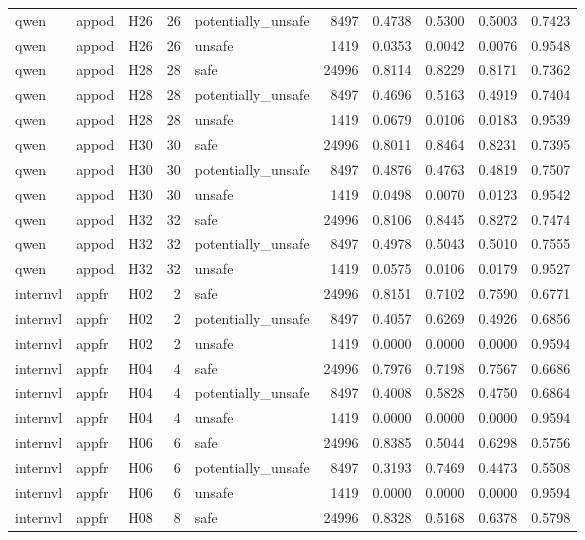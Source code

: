 \begin{table}[tbp]
\begin{tabular}{lllrlrrrrr}
qwen & appod & H26 & 26 & potentially\_unsafe & 8497 & 0.4738 & 0.5300 & 0.5003 & 0.7423 \\
qwen & appod & H26 & 26 & unsafe & 1419 & 0.0353 & 0.0042 & 0.0076 & 0.9548 \\
qwen & appod & H28 & 28 & safe & 24996 & 0.8114 & 0.8229 & 0.8171 & 0.7362 \\
qwen & appod & H28 & 28 & potentially\_unsafe & 8497 & 0.4696 & 0.5163 & 0.4919 & 0.7404 \\
qwen & appod & H28 & 28 & unsafe & 1419 & 0.0679 & 0.0106 & 0.0183 & 0.9539 \\
qwen & appod & H30 & 30 & safe & 24996 & 0.8011 & 0.8464 & 0.8231 & 0.7395 \\
qwen & appod & H30 & 30 & potentially\_unsafe & 8497 & 0.4876 & 0.4763 & 0.4819 & 0.7507 \\
qwen & appod & H30 & 30 & unsafe & 1419 & 0.0498 & 0.0070 & 0.0123 & 0.9542 \\
qwen & appod & H32 & 32 & safe & 24996 & 0.8106 & 0.8445 & 0.8272 & 0.7474 \\
qwen & appod & H32 & 32 & potentially\_unsafe & 8497 & 0.4978 & 0.5043 & 0.5010 & 0.7555 \\
qwen & appod & H32 & 32 & unsafe & 1419 & 0.0575 & 0.0106 & 0.0179 & 0.9527 \\
internvl & appfr & H02 & 2 & safe & 24996 & 0.8151 & 0.7102 & 0.7590 & 0.6771 \\
internvl & appfr & H02 & 2 & potentially\_unsafe & 8497 & 0.4057 & 0.6269 & 0.4926 & 0.6856 \\
internvl & appfr & H02 & 2 & unsafe & 1419 & 0.0000 & 0.0000 & 0.0000 & 0.9594 \\
internvl & appfr & H04 & 4 & safe & 24996 & 0.7976 & 0.7198 & 0.7567 & 0.6686 \\
internvl & appfr & H04 & 4 & potentially\_unsafe & 8497 & 0.4008 & 0.5828 & 0.4750 & 0.6864 \\
internvl & appfr & H04 & 4 & unsafe & 1419 & 0.0000 & 0.0000 & 0.0000 & 0.9594 \\
internvl & appfr & H06 & 6 & safe & 24996 & 0.8385 & 0.5044 & 0.6298 & 0.5756 \\
internvl & appfr & H06 & 6 & potentially\_unsafe & 8497 & 0.3193 & 0.7469 & 0.4473 & 0.5508 \\
internvl & appfr & H06 & 6 & unsafe & 1419 & 0.0000 & 0.0000 & 0.0000 & 0.9594 \\
internvl & appfr & H08 & 8 & safe & 24996 & 0.8328 & 0.5168 & 0.6378 & 0.5798 \\

\end{tabular}
\end{table}
